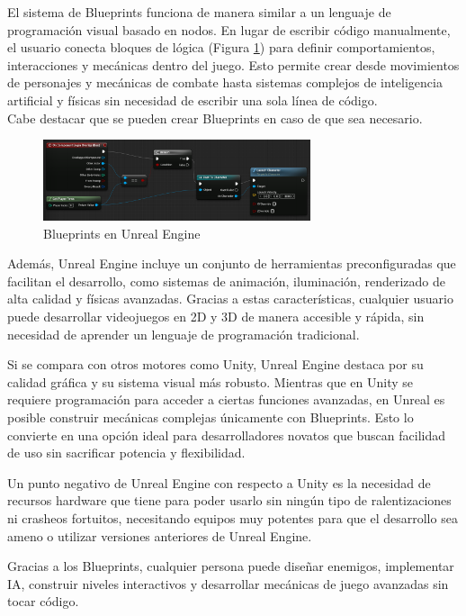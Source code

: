 El sistema de Blueprints funciona de manera similar a un lenguaje de programación visual basado en nodos. En lugar de escribir código manualmente, el usuario conecta bloques de lógica (Figura \ref{fig:BluePrints_Figure}) para definir comportamientos, interacciones y mecánicas dentro del juego. Esto permite crear desde movimientos de personajes y mecánicas de combate hasta sistemas complejos de inteligencia artificial y físicas sin necesidad de escribir una sola línea de código.\\
Cabe destacar que se pueden crear Blueprints en caso de que sea necesario.
\begin{figure}[h]
	\centering
	\includegraphics[width = 0.7\textwidth]{Imagenes/Blueprints.png}
	\caption{Blueprints en Unreal Engine}
	\label{fig:BluePrints_Figure}
\end{figure}

Además, Unreal Engine incluye un conjunto de herramientas preconfiguradas que facilitan el desarrollo, como sistemas de animación, iluminación, renderizado de alta calidad y físicas avanzadas. Gracias a estas características, cualquier usuario puede desarrollar videojuegos en 2D y 3D de manera accesible y rápida, sin necesidad de aprender un lenguaje de programación tradicional.

Si se compara con otros motores como Unity, Unreal Engine destaca por su calidad gráfica y su sistema visual más robusto. Mientras que en Unity se requiere programación para acceder a ciertas funciones avanzadas, en Unreal es posible construir mecánicas complejas únicamente con Blueprints. Esto lo convierte en una opción ideal para desarrolladores novatos que buscan facilidad de uso sin sacrificar potencia y flexibilidad.

Un punto negativo de Unreal Engine con respecto a Unity es la necesidad de recursos hardware que tiene para poder usarlo sin ningún tipo de ralentizaciones ni crasheos fortuitos, necesitando equipos muy potentes para que el desarrollo sea ameno o utilizar versiones anteriores de Unreal Engine.

Gracias a los Blueprints, cualquier persona puede diseñar enemigos, implementar IA, construir niveles interactivos y desarrollar mecánicas de juego avanzadas sin tocar código. 

